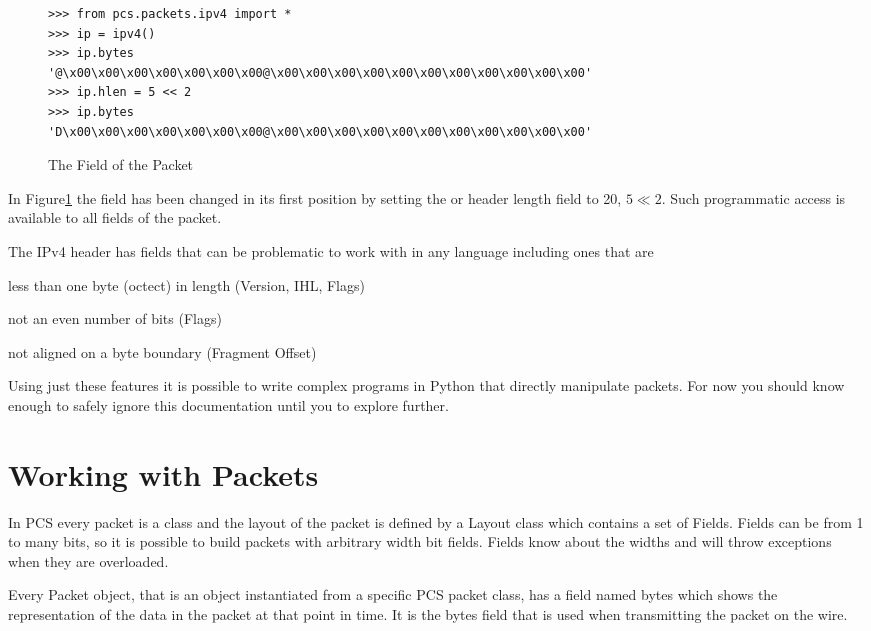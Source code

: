 \documentclass[11pt]{article}
\begin{document}
\begin{figure}
  \centering
\begin{verbatim}
>>> from pcs.packets.ipv4 import *
>>> ip = ipv4()
>>> ip.bytes
'@\x00\x00\x00\x00\x00\x00\x00@\x00\x00\x00\x00\x00\x00\x00\x00\x00\x00\x00'
>>> ip.hlen = 5 << 2
>>> ip.bytes
'D\x00\x00\x00\x00\x00\x00\x00@\x00\x00\x00\x00\x00\x00\x00\x00\x00\x00\x00'
\end{verbatim}
  \caption{The  Field of the Packet}
  \label{fig:bytes-field}
\end{figure}

In Figure\ref{fig:bytes-field} the  field has been
changed in its first position by setting the  or header
length field to 20, $5 \ll 2$.  Such programmatic access is available
to all fields of the packet.

The IPv4 header has fields that can be problematic to work with in any
language including ones that are

\begin{list}{fig:ipheadfeatures}{}
\item less than one byte (octect) in length (Version, IHL, Flags)
\item not an even number of bits (Flags)
\item not aligned on a byte boundary (Fragment Offset)
\end{list}

Using just these features it is possible to write complex programs in
Python that directly manipulate packets.  For now you should know
enough to safely ignore this documentation until you to explore further.

\section{Working with Packets}

In PCS every packet is a class and the layout of the packet is defined
by a Layout class which contains a set of Fields.  Fields can be from
1 to many bits, so it is possible to build packets with arbitrary
width bit fields.  Fields know about the widths and will throw
exceptions when they are overloaded.

Every Packet object, that is an object instantiated from a specific
PCS packet class, has a field named bytes which shows the
representation of the data in the packet at that point in time.  It is
the bytes field that is used when transmitting the packet on the wire.
\end{document}
